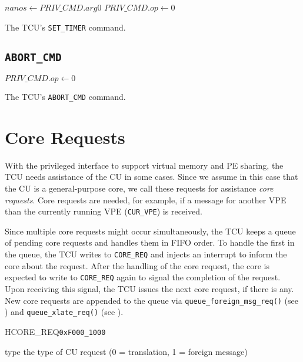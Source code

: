 \begin{algorithm}[H]
    $nanos \gets PRIV\_CMD.arg0$\;
    \BlankLine
    $PRIV\_CMD.op \gets 0$\;
    \caption{The TCU's \texttt{SET\_TIMER} command.}
\end{algorithm}

\subsection{\texttt{ABORT\_CMD}}

\begin{algorithm}[H]
    \BlankLine
    $PRIV\_CMD.op \gets 0$\;
    \caption{The TCU's \texttt{ABORT\_CMD} command.}
\end{algorithm}

\section{Core Requests}

With the privileged interface to support virtual memory and PE sharing, the TCU needs assistance of
the CU in some cases. Since we assume in this case that the CU is a general-purpose core, we call
these requests for assistance \emph{core requests}. Core requests are needed, for example, if a
message for another VPE than the currently running VPE (\texttt{CUR\_VPE}) is received.

Since multiple core requests might occur simultaneously, the TCU keeps a queue of pending core
requests and handles them in FIFO order. To handle the first in the queue, the TCU writes to
\texttt{CORE\_REQ} and injects an interrupt to inform the core about the request. After the handling
of the core request, the core is expected to write to \texttt{CORE\_REQ} again to signal the
completion of the request. Upon receiving this signal, the TCU issues the next core request, if
there is any. New core requests are appended to the queue via \texttt{queue\_foreign\_msg\_req()}
(see ) and \texttt{queue\_xlate\_req()} (see ).

\begin{register}{H}{CORE\_REQ}{\texttt{0xF000\_1000}}
  \regnewline%
  \begin{regdesc}\begin{reglist}
    \item[type] the type of CU request (0 = translation, 1 = foreign message)
  \end{reglist}\end{regdesc}
\end{register}

